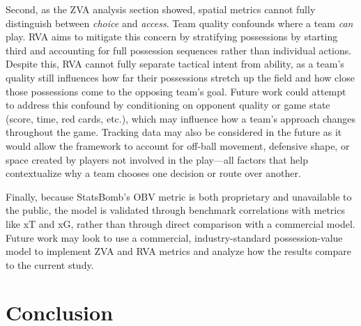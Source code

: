 \documentclass[12pt,a4paper]{article}
\begin{document}
Second, as the ZVA analysis section showed, spatial metrics cannot fully distinguish between \emph{choice} and \emph{access}. Team quality confounds where a team \emph{can} play. RVA aims to mitigate this concern by stratifying possessions by starting third and accounting for full possession sequences rather than individual actions. Despite this, RVA cannot fully separate tactical intent from ability, as a team's quality still influences how far their possessions stretch up the field and how close those possessions come to the opposing team's goal. Future work could attempt to address this confound by conditioning on opponent quality or game state (score, time, red cards, etc.), which may influence how a team's approach changes throughout the game. Tracking data may also be considered in the future as it would allow the framework to account for off-ball movement, defensive shape, or space created by players not involved in the play---all factors that help contextualize why a team chooses one decision or route over another.

Finally, because StatsBomb's OBV metric is both proprietary and unavailable to the public, the model is validated through benchmark correlations with metrics like xT and xG, rather than through direct comparison with a commercial model. Future work may look to use a commercial, industry-standard possession-value model to implement ZVA and RVA metrics and analyze how the results compare to the current study.

\section{Conclusion}
\end{document}
